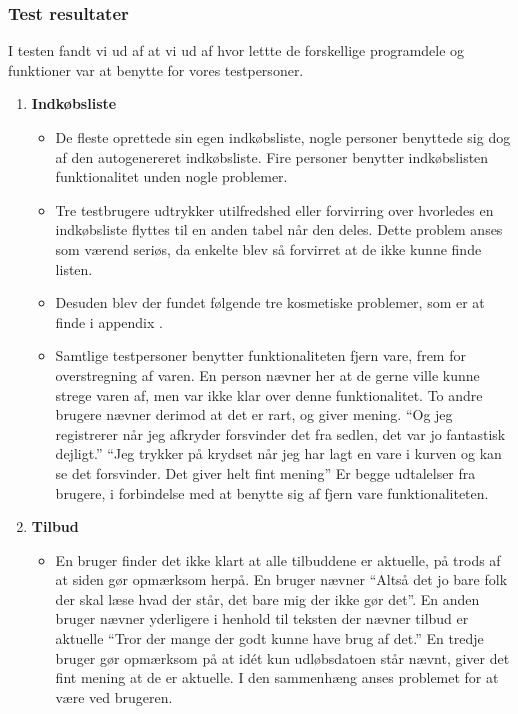 \subsubsection{Test resultater}
I testen fandt vi ud af at vi ud af hvor lettte de forskellige programdele og funktioner var at benytte for vores testpersoner.
\begin{enumerate}
   \item \textbf{Indkøbsliste}
   \begin{itemize}
      \item De fleste oprettede sin egen indkøbsliste, nogle personer benyttede sig dog af den autogenereret indkøbsliste. 
      Fire personer benytter indkøbslisten funktionalitet unden nogle problemer.
      \item Tre testbrugere udtrykker utilfredshed eller forvirring over hvorledes en indkøbsliste flyttes til en anden tabel når den deles.
      Dette problem anses som værend seriøs, da enkelte blev så forvirret at de ikke kunne finde listen. 
      \item Desuden blev der fundet følgende tre kosmetiske problemer, som er at finde i appendix .
      \item Samtlige testpersoner benytter funktionaliteten fjern vare, frem for overstregning af varen. 
      En person nævner her at de gerne ville kunne strege varen af, men var ikke klar over denne funktionalitet.
      To andre brugere nævner derimod at det er rart, og giver mening.
      ``Og jeg registrerer når jeg afkryder forsvinder det fra sedlen, det var jo fantastisk dejligt.''
      ``Jeg trykker på krydset når jeg har lagt en vare i kurven og kan se det forsvinder. Det giver helt fint mening''
      Er begge udtalelser fra brugere, i forbindelse med at benytte sig af fjern vare funktionaliteten.
   \end{itemize}
   \item \textbf{Tilbud}
   \begin{itemize}
      \item En bruger finder det ikke klart at alle tilbuddene er aktuelle, på trods af at siden gør opmærksom herpå.
      En bruger nævner ``Altså det jo bare folk der skal læse hvad der står, det bare mig der ikke gør det''.
      En anden bruger nævner yderligere i henhold til teksten der nævner tilbud er aktuelle ``Tror der mange der godt kunne have brug af det.''
      En tredje bruger gør opmærksom på at idét kun udløbsdatoen står nævnt, giver det fint mening at de er aktuelle.
      I den sammenhæng anses problemet for at være ved brugeren.

\end{itemize}
\end{enumerate}
